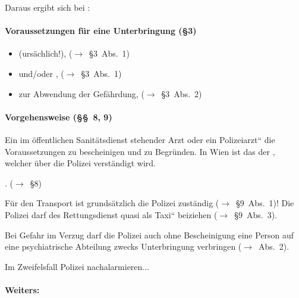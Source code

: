 Daraus ergibt sich bei :

\paragraph{Voraussetzungen für eine Unterbringung ({\S}3)}

\begin{itemize}
    \item {}
    (ursächlich!), (${\rightarrow}$~{\S}3~Abs.~1)
    \item {}  und/oder
    ,
    (${\rightarrow}$~{\S}3~Abs.~1)
    \item {} zur Abwendung der Gefährdung,
    (${\rightarrow}$~{\S}3~Abs.~2)
\end{itemize}

\paragraph{Vorgehensweise ({\S}{\S}~8, 9)}

Ein {\quotedblbase}im öffentlichen Sanitätsdienst stehender Arzt
oder ein Polizeiarzt{\textquotedblleft} die Voraussetzungen zu
bescheinigen und zu Begründen. In Wien ist das der
{\quotedblbase},
welcher über die Polizei verständigt wird. 

.
(${\rightarrow}$~{\S}8)

Für den Transport ist grundsätzlich die Polizei zuständig
(${\rightarrow}$~{\S}9~Abs.~1)! Die Polizei darf des Rettungsdienst
quasi als {\quotedblbase}Taxi{\textquotedblleft} beiziehen
(${\rightarrow}$~{\S}9~Abs.~3). 

Bei Gefahr im Verzug darf die Polizei auch ohne Bescheinigung eine
Person auf eine psychiatrische Abteilung zwecks Unterbringung
verbringen (${\rightarrow}$~Abs.~2). 

Im Zweifelsfall Polizei nachalarmieren...

\paragraph{Weiters: }~


